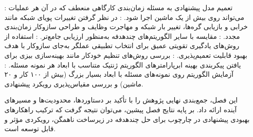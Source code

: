 :
تعمیم مدل پیشنهادی به مسئله زمان‌بندی کارگاهی منعطف
که در آن هر عملیات می‌تواند روی بیش از یک ماشین اجرا شود.
:
در نظر گرفتن تغییرات پویای شبکه
مانند خرابی و بازیابی گره‌ها، تغییر بار شبکه و مهاجرت وظایف
و طراحی سازوکار زمان‌بندی مجدد.
:
مقایسه با سایر الگوریتم‌های چندهدفه
به‌منظور ارزیابی جامع‌تر.
:
استفاده از روش‌های یادگیری تقویتی عمیق
برای انتخاب تطبیقی عملگر به‌جای سازوکار 
با هدف بهبود قابلیت تعمیم‌پذیری.
:
بررسی روش‌های تنظیم خودکار
مانند بهینه‌سازی بیزی
برای یافتن پیکربندی بهینه ابرپارامترهای الگوریتم ژنتیک
متناسب با ابعاد هر نمونه مسئله.
:
آزمایش الگوریتم روی نمونه‌های مسئله با ابعاد بسیار بزرگ
(بیش از ۱۰۰ کار و ۲۰ ماشین)
و بررسی مقیاس‌پذیری رویکرد پیشنهادی.



این فصل، جمع‌بندی نهایی پژوهش را با تأکید بر دستاوردها، محدودیت‌ها و مسیرهای آینده ارائه داد.
بر پایه نتایج فصل پیشین، می‌توان نتیجه گرفت که ترکیب راهکارهای بهبودی پیشنهادی
در چارچوب  برای حل چندهدفه  در زیرساخت ناهمگن، رویکردی مؤثر و قابل توسعه است.
